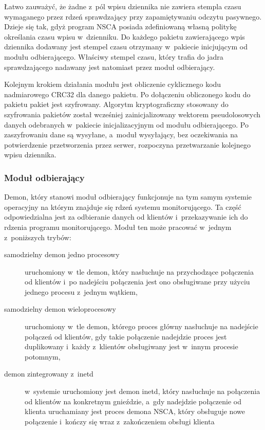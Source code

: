 Łatwo zauważyć, że żadne z~pól wpisu dziennika nie zawiera stempla
czasu wymaganego przez rdzeń sprawdzający przy zapamiętywaniu odczytu
pasywnego. Dzieje się tak, gdyż program NSCA posiada zdefiniowaną
własną politykę określania czasu wpisu w~dzienniku. Do każdego pakietu
zawierającego wpis dziennika dodawany jest stempel czasu otrzymany
w~pakiecie inicjującym od modułu odbierającego. Właściwy stempel
czasu, który trafia do jadra sprawdzającego nadawany jest natomiast
przez moduł odbierający.

Kolejnym krokiem działania modułu jest obliczenie cyklicznego kodu
nadmiarowego CRC32 dla danego pakietu. Po dołączeniu obliczonego kodu
do pakietu pakiet jest szyfrowany. Algorytm kryptograficzny stosowany do
szyfrowania pakietów został wcześniej zainicjalizowany wektorem
pseudolosowych danych odebranych w~pakiecie inicjalizacyjnym od modułu
odbierającego. Po zaszyfrowaniu dane są wysyłane, a~moduł wysyłający,
bez oczekiwania na potwierdzenie przetworzenia przez serwer,
rozpoczyna przetwarzanie kolejnego wpisu dziennika.

\subsubsection[Moduł odbierający][Moduł odbierający]{Moduł odbierający}

Demon, który stanowi moduł odbierający funkcjonuje na tym samym
systemie operacyjny na którym znajduje się rdzeń systemu
monitorującego. Ta część odpowiedzialna jest za odbieranie danych od
klientów i~przekazywanie ich do rdzenia programu monitorującego. Moduł
ten może pracować w~jednym z~poniższych trybów:

\begin{description}
\item[samodzielny demon jedno procesowy] uruchomiony w~tle demon, który
  nasłuchuje na przychodzące połączenia od klientów i~po nadejściu
  połączenia jest ono obsługiwane przy użyciu jednego procesu z~jednym
  wątkiem,
\item[samodzielny demon wieloprocesowy] uruchomiony w~tle demon,
  którego proces główny nasłuchuje na nadejście połączeń od klientów,
  gdy takie połączenie nadejdzie proces jest duplikowany i~każdy
  z~klientów obsługiwany jest w~innym procesie potomnym,
\item[demon zintegrowany z~inetd] w~systemie uruchomiony jest demon
  inetd, który nasłuchuje na połączenia od klientów na konkretnym
  gnieździe, a~gdy nadejdzie połączenie od klienta uruchamiany jest
  proces demona NSCA, który obsługuje nowe połączenie i~kończy się
  wraz z~zakończeniem obsługi klienta
\end{description}

